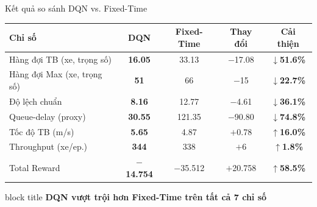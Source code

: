 \begin{frame}{Kết quả so sánh DQN vs. Fixed-Time}
  \begin{center}
  \renewcommand{\arraystretch}{1.25}
  \begin{tabular}{lcccc}
    \toprule
    \textbf{Chỉ số} & \textbf{DQN} & \textbf{Fixed-Time} & \textbf{Thay đổi} & \textbf{Cải thiện}\\
    \midrule
    \rowcolor{lightgreen}
    Hàng đợi TB (xe, trọng số) & \textbf{16.05} & 33.13 & $-$17.08 & \textcolor{techgreen}{\textbf{$\downarrow$51.6\%}}\\
    Hàng đợi Max (xe, trọng số) & \textbf{51}    & 66    & $-$15    & \textcolor{techgreen}{\textbf{$\downarrow$22.7\%}}\\
    \rowcolor{lightgreen}
    Độ lệch chuẩn        & \textbf{8.16}  & 12.77 & $-$4.61  & \textcolor{techgreen}{\textbf{$\downarrow$36.1\%}}\\
    Queue-delay (proxy)  & \textbf{30.55} & 121.35& $-$90.80 & \textcolor{techgreen}{\textbf{$\downarrow$74.8\%}}\\
    \rowcolor{lightgreen}
    Tốc độ TB (m/s)      & \textbf{5.65}  & 4.87  & $+$0.78  & \textcolor{techgreen}{\textbf{$\uparrow$16.0\%}}\\
    Throughput (xe/ep.)  & \textbf{344}   & 338   & $+$6     & \textcolor{techgreen}{\textbf{$\uparrow$1.8\%}}\\
    \rowcolor{lightgreen}
    Total Reward         & \textbf{$-$14.754} & $-$35.512 & $+$20.758 & \textcolor{techgreen}{\textbf{$\uparrow$58.5\%}}\\
    \bottomrule
  \end{tabular}
  \end{center}
  \vspace{6pt}
  \begin{center}
    \begin{beamercolorbox}[sep=6pt, center, rounded=true]{block title}
      \textbf{DQN vượt trội hơn Fixed-Time trên tất cả 7 chỉ số}
    \end{beamercolorbox}
  \end{center}
\end{frame}

